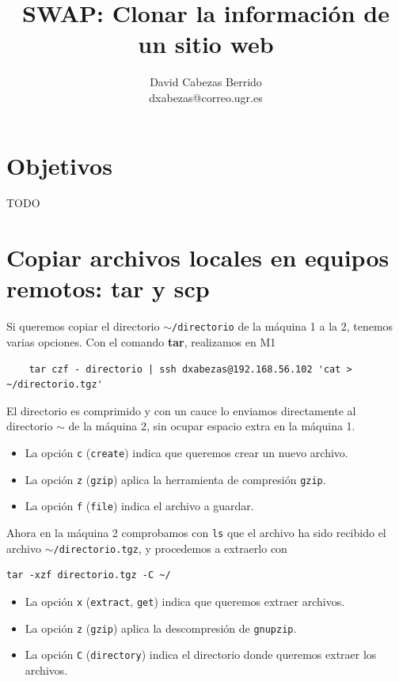 \documentclass{article}
\title{\Huge SWAP: Clonar la información de un sitio web\vspace{10mm}}
\author{\huge David Cabezas Berrido \vspace{10mm} \\ 
  \huge dxabezas@correo.ugr.es \vspace{10mm}}
\begin{document}
\maketitle
\tableofcontents
\newpage

\section{Objetivos}

TODO

\section{Copiar archivos locales en equipos remotos: tar y scp}

Si queremos copiar el directorio \texttt{$\mathtt{\sim}$/directorio} de la máquina 1 a la 2, tenemos varias opciones.
Con el comando \textbf{tar}, realizamos en M1
\begin{lstlisting}
	tar czf - directorio | ssh dxabezas@192.168.56.102 'cat > ~/directorio.tgz'
\end{lstlisting}

El directorio es comprimido y con un cauce lo enviamos directamente al directorio \texttt{$\mathtt{\sim}$} de la máquina 2, sin ocupar
 espacio extra en la máquina 1.

\begin{itemize}
	\item La opción \texttt{c} (\texttt{create}) indica que queremos crear un nuevo archivo.
	\item La opción \texttt{z} (\texttt{gzip}) aplica la herramienta de compresión \texttt{gzip}.
	\item La opción \texttt{f} (\texttt{file}) indica el archivo a guardar.
\end{itemize}

Ahora en la máquina 2 comprobamos con \texttt{ls} que el archivo ha sido recibido el archivo \texttt{$\mathtt{\sim}$/directorio.tgz},
y procedemos a extraerlo con
\begin{lstlisting}
tar -xzf directorio.tgz -C ~/
\end{lstlisting}

\begin{itemize}
	\item La opción \texttt{x} (\texttt{extract}, \texttt{get}) indica que queremos extraer archivos.
	\item La opción \texttt{z} (\texttt{gzip}) aplica la descompresión de \texttt{gnupzip}.
	\item La opción \texttt{C} (\texttt{directory}) indica el directorio donde queremos extraer los archivos.
\end{itemize}
\end{document}
